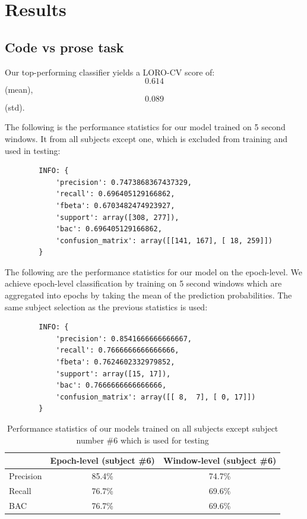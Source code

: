 \chapter{Results}


    \section{Code vs prose task}

        Our top-performing classifier yields a LORO-CV score of: $$0.614$$ (mean), $$0.089$$ (std).

        The following is the performance statistics for our model trained on 5 second windows. It from all subjects except one, which is excluded from training and used in testing:

        \begin{verbatim}
        INFO: {
            'precision': 0.7473868367437329, 
            'recall': 0.696405129166862, 
            'fbeta': 0.6703482474923927, 
            'support': array([308, 277]), 
            'bac': 0.696405129166862, 
            'confusion_matrix': array([[141, 167], [ 18, 259]])
        }
        \end{verbatim}

        The following are the performance statistics for our model on the epoch-level. We achieve epoch-level classification by training on 5 second windows which are aggregated into epochs by taking the mean of the prediction probabilities. The same subject selection as the previous statistics is used:

        \begin{verbatim}
        INFO: {
            'precision': 0.8541666666666667, 
            'recall': 0.7666666666666666, 
            'fbeta': 0.7624602332979852, 
            'support': array([15, 17]), 
            'bac': 0.7666666666666666, 
            'confusion_matrix': array([[ 8,  7], [ 0, 17]])
        }
        \end{verbatim}

        \begin{table}
            \begin{center}
                \begin{tabular}{ l | c | c }
                  \toprule
                  & Epoch-level (subject \#6) & Window-level (subject \#6) \\ \midrule
                  Precision & 85.4\% & 74.7\% \\
                  Recall & 76.7\% & 69.6\% \\
                  BAC & 76.7\% & 69.6\% \\
                  \bottomrule
                  
                \end{tabular}
                \caption{Performance statistics of our models trained on all subjects except subject number \#6 which is used for testing}\label{fig:stats}
            \end{center}
        \end{table}

